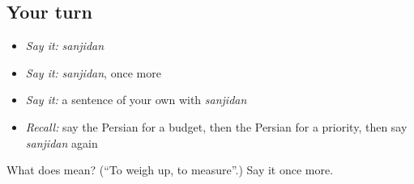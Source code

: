 \subsection*{Your turn}
\begin{itemize}
\raggedright
  \item \emph{Say it:} \emph{sanjidan}
  \item \emph{Say it:} \emph{sanjidan}, once more
  \item \emph{Say it:} a sentence of your own with \emph{sanjidan}
  \item \emph{Recall:} say the Persian for a budget, then the Persian for a priority, then say \emph{sanjidan} again
\end{itemize}

\begin{tcolorbox}[breakable,colback=teal!4,colframe=teal!35!black,title={Before you move on}]
What does  mean? (\textquotedblleft{}To weigh up, to measure\textquotedblright{}.) Say it once more.
\end{tcolorbox}
